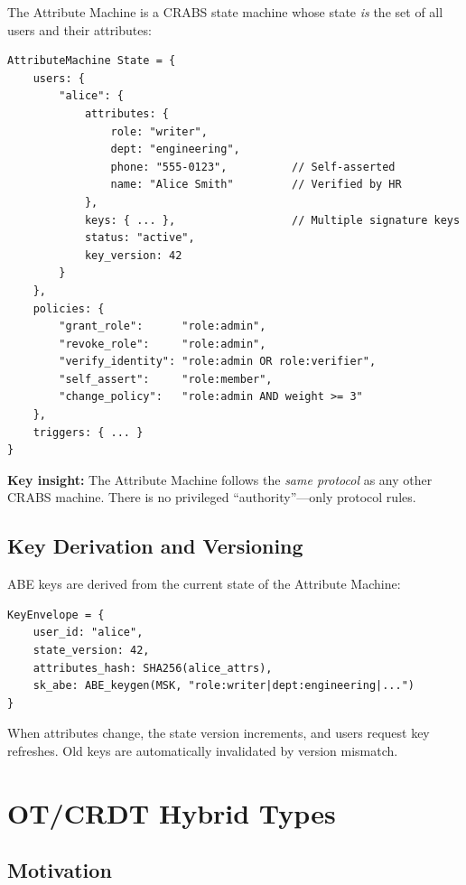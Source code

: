 \documentclass[11pt,a4paper]{article}
\begin{document}
The Attribute Machine is a CRABS state machine whose state \textit{is} the set of all users and their attributes:

\begin{lstlisting}
AttributeMachine State = {
    users: {
        "alice": {
            attributes: {
                role: "writer",
                dept: "engineering",
                phone: "555-0123",          // Self-asserted
                name: "Alice Smith"         // Verified by HR
            },
            keys: { ... },                  // Multiple signature keys
            status: "active",
            key_version: 42
        }
    },
    policies: {
        "grant_role":      "role:admin",
        "revoke_role":     "role:admin",
        "verify_identity": "role:admin OR role:verifier",
        "self_assert":     "role:member",
        "change_policy":   "role:admin AND weight >= 3"
    },
    triggers: { ... }
}
\end{lstlisting}

\textbf{Key insight:} The Attribute Machine follows the \textit{same protocol} as any other CRABS machine. There is no privileged ``authority''---only protocol rules.

\subsection{Key Derivation and Versioning}

ABE keys are derived from the current state of the Attribute Machine:

\begin{lstlisting}
KeyEnvelope = {
    user_id: "alice",
    state_version: 42,
    attributes_hash: SHA256(alice_attrs),
    sk_abe: ABE_keygen(MSK, "role:writer|dept:engineering|...")
}
\end{lstlisting}

When attributes change, the state version increments, and users request key refreshes. Old keys are automatically invalidated by version mismatch.

\section{OT/CRDT Hybrid Types}

\subsection{Motivation}
\end{document}
